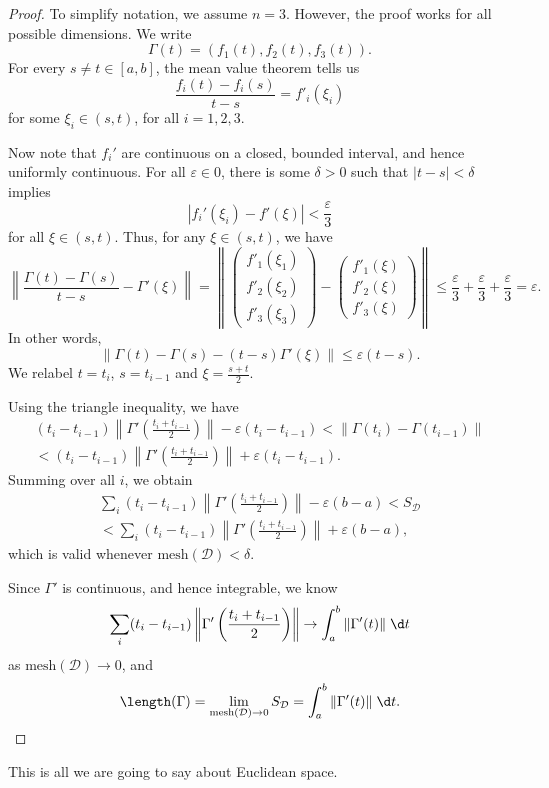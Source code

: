 \documentclass[a4paper]{article}
\begin{document}
\begin{proof}
  To simplify notation, we assume $n = 3$. However, the proof works for all possible dimensions. We write
  \[
    \Gamma(t) = (f_1(t), f_2(t), f_3(t)).
  \]
  For every $s \not= t \in [a, b]$, the mean value theorem tells us
  \[
    \frac{f_i(t) - f_i(s)}{t - s} = f'_i (\xi_i)
  \]
  for some $\xi_i \in (s, t)$, for all $i = 1, 2, 3$.

  Now note that $f_i'$ are continuous on a closed, bounded interval, and hence uniformly continuous. For all $\varepsilon \in 0$, there is some $\delta > 0$ such that $|t - s| < \delta$ implies
  \[
    |f_i'(\xi_i) - f'(\xi)| < \frac{\varepsilon}{3}
  \]
  for all $\xi \in (s, t)$. Thus, for any $\xi \in (s, t)$, we have
  \[
    \left\|\frac{\Gamma(t) - \Gamma(s)}{t - s} - \Gamma'(\xi)\right\| = \left\|\begin{pmatrix}f'_1(\xi_1)\\ f'_2(\xi_2)\\ f'_3(\xi_3)\end{pmatrix} - \begin{pmatrix}f'_1(\xi)\\ f'_2(\xi)\\ f'_3(\xi)\end{pmatrix}\right\| \leq \frac{\varepsilon}{3} + \frac{\varepsilon}{3} + \frac{\varepsilon}{3} = \varepsilon.
  \]
  In other words,
  \[
    \|\Gamma(t) - \Gamma(s) - (t - s) \Gamma'(\xi)\| \leq \varepsilon(t - s).
  \]
  We relabel $t = t_i$, $s = t_{i - 1}$ and $\xi = \frac{s + t}{2}$.

  Using the triangle inequality, we have
  \begin{multline*}
    (t_i - t_{i - 1}) \left\|\Gamma'\left(\frac{t_i + t_{i - 1}}{2}\right)\right\| - \varepsilon(t_i - t_{i - 1}) < \|\Gamma(t_i) - \Gamma(t_{i - 1})\| \\
    < (t_i - t_{i - 1}) \left\|\Gamma'\left(\frac{t_i + t_{i - 1}}{2}\right)\right\| + \varepsilon(t_i - t_{i - 1}).
  \end{multline*}
  Summing over all $i$, we obtain
  \begin{multline*}
    \sum_i (t_i - t_{i - 1}) \left\|\Gamma'\left(\frac{t_i + t_{i - 1}}{2}\right)\right\| - \varepsilon(b - a) < S_{\mathcal{D}}\\
    < \sum_i (t_i - t_{i - 1}) \left\|\Gamma'\left(\frac{t_i + t_{i - 1}}{2}\right)\right\| + \varepsilon(b - a),
  \end{multline*}
  which is valid whenever $\mathrm{mesh}(\mathcal{D}) < \delta$.

  Since $\Gamma'$ is continuous, and hence integrable, we know
  \[
    \sum_i (t_i - t_{i - 1}) \left\|\Gamma'\left(\frac{t_i + t_{i - 1}}{2}\right)\right\| \to \int_a^b \|\Gamma'(t)\|\;\d t
  \]
  as $\mathrm{mesh}(\mathcal{D}) \to 0$, and
  \[
    \length(\Gamma) = \lim_{\mathrm{mesh}(\mathcal{D}) \to 0} S_\mathcal{D} = \int_a^b \|\Gamma'(t)\|\;\d t.
  \]
\end{proof}
This is all we are going to say about Euclidean space.
\end{document}
